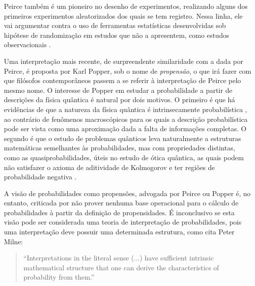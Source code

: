 Peirce também é um pioneiro no desenho de experimentos, realizando alguns dos primeiros experimentos aleatorizados
dos quais se tem registro. 
Nessa linha, ele vai argumentar contra o uso de ferramentas estatísticas desenvolvidas sob
hipótese de randomização em estudos que não a apresentem, como estudos observacionais \citep{Stigler78}.

Uma interpretação mais recente, de surpreendente similaridade com a dada por Peirce, é proposta por Karl Popper, sob o nome
de {\em propensão}, o que irá fazer com que filósofos contemporâneos passem a se referir à interpretação de Peirce pelo mesmo
nome.
O interesse de Popper em estudar a probabilidade a partir de
descrições da física quântica é natural por dois motivos. 
O primeiro
é que há evidências de que a natureza da física quântica é intrinsecamente probabilística \citep{Gudder88}, ao contrário 
de fenômenos
macroscópicos para os quais a descrição probabilística pode ser vista como uma aproximação dada a falta de informações completas.
O segundo é que o estudo de problemas quânticos leva naturalmente a estruturas matemáticas semelhantes às probabilidades, mas
com propriedades distintas, como as quasiprobabilidades, úteis no estudo de ótica quântica, as quais podem não satisfazer o
axioma de aditividade de Kolmogorov e ter regiões de probabilidade
negativa \citep{Mandel95}. %

A visão de probabilidades como propensões, advogada por Peirce ou Popper é, 
no entanto, criticada por não prover nenhuma base operacional para o cálculo de probabilidades à partir
da definição de propensidades. É inconclusivo se esta visão pode ser considerada uma teoria de interpretação
de probabilidades, pois uma interpretação deve possuir uma determinada estrutura, como cita Peter Milne:

\begin{quote}
``Interpretations in the literal sense (...) have sufficient intrinsic mathematical structure that one can derive
the characteristics of probability from them.''\citep{Milne93}
\end{quote}

